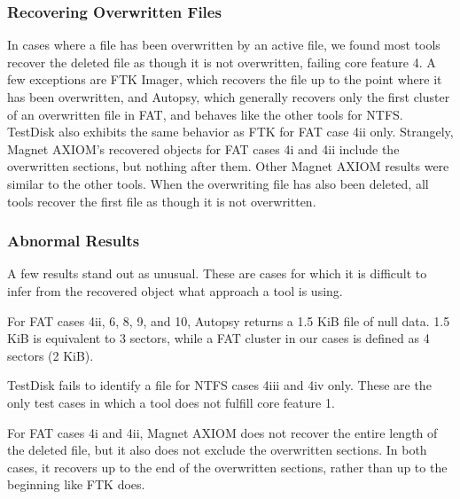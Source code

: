 \subsubsection{Recovering Overwritten Files}
In cases where a file has been overwritten by an active file, we found most tools recover the deleted file as though it is not overwritten, failing core feature 4. 
A few exceptions are FTK Imager, which recovers the file up to the point where it has been overwritten, and Autopsy, which generally recovers only the first cluster of an overwritten file in FAT, and behaves like the other tools for NTFS. 
TestDisk also exhibits the same behavior as FTK for FAT case 4ii only. 
Strangely, Magnet AXIOM's recovered objects for FAT cases 4i and 4ii include the overwritten sections, but nothing after them.
Other Magnet AXIOM results were similar to the other tools.
When the overwriting file has also been deleted, all tools recover the first file as though it is not overwritten.

\subsubsection{Abnormal Results}
A few results stand out as unusual.
These are cases for which it is difficult to infer from the recovered object what approach a tool is using.

For FAT cases 4ii, 6, 8, 9, and 10, Autopsy returns a 1.5 KiB file of null data.
1.5 KiB is equivalent to 3 sectors, while a FAT cluster in our cases is defined as 4 sectors (2 KiB).

TestDisk fails to identify a file for NTFS cases 4iii and 4iv only. 
These are the only test cases in which a tool does not fulfill core feature 1.

For FAT cases 4i and 4ii, Magnet AXIOM does not recover the entire length of the deleted file, but it also does not exclude the overwritten sections. 
In both cases, it recovers up to the end of the overwritten sections, rather than up to the beginning like FTK does.
